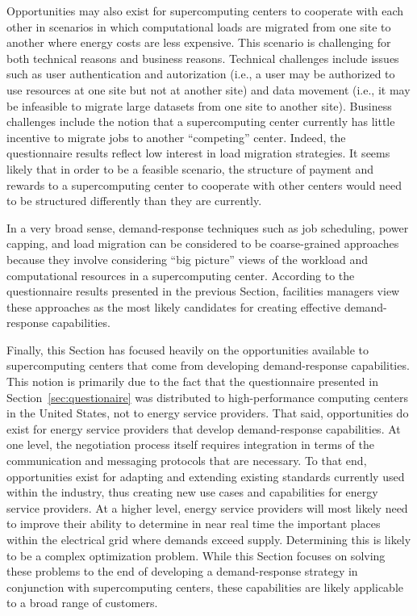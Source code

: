 Opportunities may also exist for supercomputing centers to cooperate
with each other in scenarios in which computational loads are migrated
from one site to another where energy costs are less expensive.  This
scenario is challenging for both technical reasons and business reasons.
Technical challenges include issues such as user authentication and
autorization (i.e., a user may be authorized to use resources at one
site but not at another site) and data movement (i.e., it may be
infeasible to migrate large datasets from one site to another site).
Business challenges include the notion that a supercomputing center
currently has little incentive to migrate jobs to another ``competing''
center.  Indeed, the questionnaire results reflect low interest in
load migration strategies.  It seems likely that in order to be a
feasible scenario, the structure of payment and rewards to a
supercomputing center to cooperate with other centers would need to
be structured differently than they are currently.

In a very broad sense, demand-response techniques such as job scheduling,
power capping, and load migration can be considered to be coarse-grained
approaches because they involve considering ``big picture'' views of the
workload and computational resources in a supercomputing center.  According
to the questionnaire results presented in the previous Section, facilities
managers view these approaches as the most likely candidates for creating
effective demand-response capabilities.

Finally, this Section has focused heavily on the opportunities available
to supercomputing centers that come from developing demand-response
capabilities.  This notion is primarily due to the fact that the
questionnaire presented in Section~\ref{sec:questionaire} was
distributed to high-performance computing centers in the United
States, not to energy service providers.  That said, opportunities do
exist for energy service providers that develop demand-response
capabilities.  At one level, the negotiation process itself requires
integration in terms of the communication and messaging protocols that
are necessary.  To that end, opportunities exist for adapting and extending
existing standards currently used within the industry, thus creating new
use cases and capabilities for energy service providers.  At a higher
level, energy service providers will most likely need to improve their
ability to determine in near real time the important places within the
electrical grid where demands exceed supply.  Determining this is likely
to be a complex optimization problem.  While this Section focuses on
solving these problems to the end of developing a demand-response
strategy in conjunction with supercomputing centers, these capabilities
are likely applicable to a broad range of customers.
